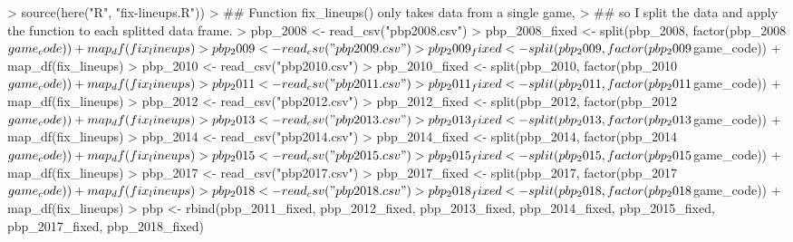 \documentclass[paper=a4, fontsize=9pt]{article}
\begin{document}
\begin{Schunk}
\begin{Sinput}
> source(here("R", "fix-lineups.R"))
> ## Function fix_lineups() only takes data from a single game,
> ## so I split the data and apply the function to each splitted data frame.
> pbp_2008 <- read_csv("pbp2008.csv")
> pbp_2008_fixed <- split(pbp_2008, factor(pbp_2008$game_code)) %
+   map_df(fix_lineups) 
> pbp_2009 <- read_csv("pbp2009.csv")
> pbp_2009_fixed <- split(pbp_2009, factor(pbp_2009$game_code)) %
+   map_df(fix_lineups) 
> pbp_2010 <- read_csv("pbp2010.csv")
> pbp_2010_fixed <- split(pbp_2010, factor(pbp_2010$game_code)) %
+   map_df(fix_lineups) 
> pbp_2011 <- read_csv("pbp2011.csv")
> pbp_2011_fixed <- split(pbp_2011, factor(pbp_2011$game_code)) %
+   map_df(fix_lineups) 
> pbp_2012 <- read_csv("pbp2012.csv")
> pbp_2012_fixed <- split(pbp_2012, factor(pbp_2012$game_code)) %
+   map_df(fix_lineups) 
> pbp_2013 <- read_csv("pbp2013.csv")
> pbp_2013_fixed <- split(pbp_2013, factor(pbp_2013$game_code)) %
+   map_df(fix_lineups) 
> pbp_2014 <- read_csv("pbp2014.csv")
> pbp_2014_fixed <- split(pbp_2014, factor(pbp_2014$game_code)) %
+   map_df(fix_lineups) 
> pbp_2015 <- read_csv("pbp2015.csv")
> pbp_2015_fixed <- split(pbp_2015, factor(pbp_2015$game_code)) %
+   map_df(fix_lineups) 
> pbp_2017 <- read_csv("pbp2017.csv")
> pbp_2017_fixed <- split(pbp_2017, factor(pbp_2017$game_code)) %
+   map_df(fix_lineups) 
> pbp_2018 <- read_csv("pbp2018.csv")
> pbp_2018_fixed <- split(pbp_2018, factor(pbp_2018$game_code)) %
+   map_df(fix_lineups)
> pbp <- rbind(pbp_2011_fixed, pbp_2012_fixed, pbp_2013_fixed, pbp_2014_fixed, pbp_2015_fixed, pbp_2017_fixed, pbp_2018_fixed)
\end{Sinput}
\end{Schunk}
\end{document}
